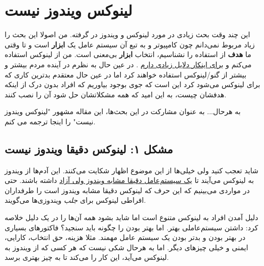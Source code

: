 \section{لینوکس ویندوز نیست}
این چند وقت بحث زیادی در مورد لینوکس و ویندوز در گرفته. من اصولا این بحث را زیاد مربوط نمی‌دانم چون کامپیوتر و به تبع آن سیستم عامل یک
\textbf{ابزار}
است و تا وقتی ما
\textbf{هدف}
از استفاده را نشناسیم، انتخاب
\textbf{ابزار}
بی‌معنی است. من از لینوکس استفاده می‌کنم و
\href{http://www.google.com/search?client=safari&amp;rls=en-us&amp;q=site:jadi.net+لینوکس&amp;ie=UTF-8&amp;oe=UTF-8}{برای اینکار دلایل زیادی دارم}
. در عین حال به نظرم در آینده مردم بیشتر و بیشتر از گنو/لینوکس استفاده خواهند کرد اما در عین حال معتقدم بدترین کاری که برای لینوکس می‌شود کرد این است که جوی بوجود بیاوریم که افراد بدون درک از اینکه هدفشان چیست،‌ به این امید که همه مشکلاتشان حل شود آن را نصب کنند. 


به هرحال... به عنوان مشارکت در این بحث‌ها،‌ این مقاله مشهور "لینوکس ویندوز نیست"
 را اینجا ترجمه می کنم.
\begin{center}
	\begin{figure}[H]
		\centering
	\end{figure}
\end{center}
\subsection*{مشکل ۱: لینوکس دقیقا ویندوز نیست}
شاید تعجب کنید ولی خیلی‌ها از این موضوع اظهار شکایت می‌کنند. این آدم‌ها از ویندوز به لینوکس می‌آیند تا
\href{http://www.reactos.com/' }{یک سیستم‌عامل دقیقا مشابه ویندوز ولی آزاد}
داشته باشند. حتی در مواردی می‌بینیم که این حرف که لینوکس دقیقا مشابه ویندوز است را طرفداران افراطی لینوکس برای
\emph{جلب}
ویندوزی‌ها می‌گویند.

دلیل آمدن افراد به لینوکس متنوع است اما شاید بشود همه آن‌ها را در یک دلیل خلاصه کرد: داشتن سیستم‌عاملی بهتر. اما بهتر بودن را چگونه باید سنجید؟ فاکتورهای بسیاری در بهتر بودن و بدتر بودن یک سیستم عامل مهمند. مثلا هزینه، حق انتخاب، کارایی، ایمنی و خیلی چیزهای دیگر. اما به هرحال شکی نیست که هر کسی که از ویندوز به لینوکس می‌آید، این کار را می‌کند تا به چیز بهتری برسد.

